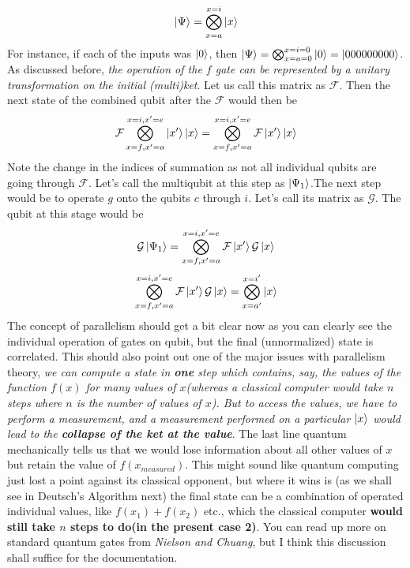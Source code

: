 \documentclass[12pt]{article}
\begin{document}
$$\Ket{\Psi} = \bigotimes_{x=a}^{x=i}\Ket{x}$$ For instance, if each of the inputs was $\Ket{0}$, then $\Ket{\Psi} = \bigotimes_{x=a=0}^{x=i=0}\Ket{0}=\Ket{000000000}$. As discussed before, \textit{the operation of the $f$ gate can be represented by a unitary transformation on the initial (multi)ket}. Let us call this matrix as $\mathcal{F}$. Then the next state of the combined qubit after the $\mathcal{F}$  would then be $$\mathcal{F}\bigotimes_{x=f,x'=a}^{x=i,x'=e}\Ket{x'}\Ket{x} = \bigotimes_{x=f,x'=a}^{x=i,x'=e}\mathcal{F}\Ket{x'}\Ket{x}$$ Note the change in the indices of summation as not all individual qubits are going through $\mathcal{F}$. Let's call the multiqubit at this step as $\Ket{\Psi_{1}}$.The next step would be to operate $g$ onto the qubits $c$ through $i$. Let's call its matrix as $\mathcal{G}$. The qubit at this stage would be $$\mathcal{G}\Ket{\Psi_{1}} =  \bigotimes_{x=f,x'=a}^{x=i,x'=e}\mathcal{F}\Ket{x'}\mathcal{G}\Ket{x}$$
$$\bigotimes_{x=f,x'=a}^{x=i,x'=e}\mathcal{F}\Ket{x'}\mathcal{G}\Ket{x} = \bigotimes_{x=a'}^{x=i'}\Ket{x}$$
The concept of parallelism should get a bit clear now as you can clearly see the individual operation of gates on qubit, but the final (unnormalized) state is correlated. This should also point out one of the major issues with parallelism theory, \textit{we can compute a state in \textbf{one} step which contains, say, the values of the function $f(x)$ for many values of $x$(whereas a classical computer would take $n$ steps where $n$ is the number of values of $x$). But to access the values, we have to perform a measurement, and a measurement performed on a particular $\Ket{x}$ would lead to the \textbf{collapse of the ket at the value}}. The last line quantum mechanically tells us that we would lose information about all other values of $x$  but retain the value of $f(x_{measured})$. This might sound like quantum computing just lost a point against its classical opponent, but where it wins is (as we shall see in Deutsch's Algorithm next) the final state can be a combination of operated individual values, like $f(x_1)+f(x_2)$ etc., which the classical computer \textbf{would still take $n$ steps to do(in the present case 2)}. You can read up more on standard quantum gates from \textit{Nielson and Chuang}, but I think this discussion shall suffice for the documentation.
\end{document}
